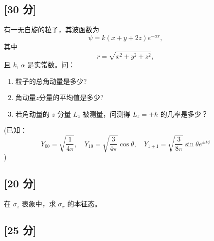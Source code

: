 \subsection{[30 分]}
有一无自旋的粒子，其波函数为
\[
\psi = k(x + y + 2z)e^{-\alpha r},~
\]
其中
\[
r = \sqrt{x^2 + y^2 + z^2},~
\]
且 $k$, $\alpha$ 是实常数。问：
\begin{enumerate}
\item 粒子的总角动量是多少?
\item 角动量$z$分量的平均值是多少?
\item 若角动量的 $z$ 分量 $L_z$ 被测量，问测得 $L_z = +\hbar$ 的几率是多少？
\end{enumerate}
(已知：
\[
Y_{00} = \sqrt{\frac{1}{4\pi}}, \quad Y_{10} = \sqrt{\frac{3}{4\pi}} \cos\theta, \quad Y_{1\pm1} = \sqrt{\frac{3}{8\pi}} \sin\theta e^{\pm i\phi}~
\])
\subsection{[20 分]}
在 $\sigma_z$ 表象中，求 $\sigma_x$ 的本征态。
\subsection{[25 分]}